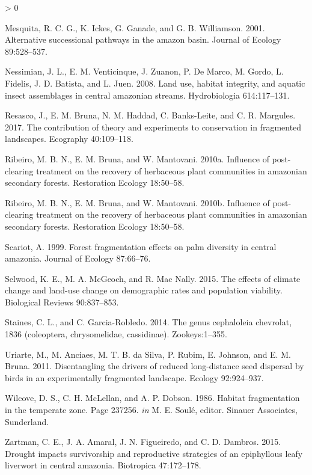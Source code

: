 \documentclass[
  english,
  man]{apa6}
\newlength{\cslhangindent}
\newenvironment{CSLReferences}[2] %
 {%
  \setlength{\parindent}{0pt}
  \ifodd #1 \everypar{\setlength{\hangindent}{\cslhangindent}}\ignorespaces\fi
  \ifnum #2 > 0
  \setlength{\parskip}{#2\baselineskip}
  \fi
 }%
 {}
\begin{document}
\begin{CSLReferences}{1}{0}
\leavevmode\hypertarget{ref-mesquita2001}{}%
Mesquita, R. C. G., K. Ickes, G. Ganade, and G. B. Williamson. 2001. Alternative successional pathways in the amazon basin. Journal of Ecology 89:528--537.

\leavevmode\hypertarget{ref-nessimian2008}{}%
Nessimian, J. L., E. M. Venticinque, J. Zuanon, P. De Marco, M. Gordo, L. Fidelis, J. D. Batista, and L. Juen. 2008. Land use, habitat integrity, and aquatic insect assemblages in central amazonian streams. Hydrobiologia 614:117--131.

\leavevmode\hypertarget{ref-resasco2017}{}%
Resasco, J., E. M. Bruna, N. M. Haddad, C. Banks-Leite, and C. R. Margules. 2017. The contribution of theory and experiments to conservation in fragmented landscapes. Ecography 40:109--118.

\leavevmode\hypertarget{ref-ribeiro2010}{}%
Ribeiro, M. B. N., E. M. Bruna, and W. Mantovani. 2010a. Influence of post-clearing treatment on the recovery of herbaceous plant communities in amazonian secondary forests. Restoration Ecology 18:50--58.

\leavevmode\hypertarget{ref-ribeiro2010a}{}%
Ribeiro, M. B. N., E. M. Bruna, and W. Mantovani. 2010b. Influence of post-clearing treatment on the recovery of herbaceous plant communities in amazonian secondary forests. Restoration Ecology 18:50--58.

\leavevmode\hypertarget{ref-scariot1999}{}%
Scariot, A. 1999. Forest fragmentation effects on palm diversity in central amazonia. Journal of Ecology 87:66--76.

\leavevmode\hypertarget{ref-selwood2015a}{}%
Selwood, K. E., M. A. McGeoch, and R. Mac Nally. 2015. The effects of climate change and land{-}use change on demographic rates and population viability. Biological Reviews 90:837--853.

\leavevmode\hypertarget{ref-staines2014}{}%
Staines, C. L., and C. Garcia-Robledo. 2014. The genus cephaloleia chevrolat, 1836 (coleoptera, chrysomelidae, cassidinae). Zookeys:1--355.

\leavevmode\hypertarget{ref-uriarte2011}{}%
Uriarte, M., M. Anciaes, M. T. B. da Silva, P. Rubim, E. Johnson, and E. M. Bruna. 2011. Disentangling the drivers of reduced long-distance seed dispersal by birds in an experimentally fragmented landscape. Ecology 92:924--937.

\leavevmode\hypertarget{ref-wilcove1986}{}%
Wilcove, D. S., C. H. McLellan, and A. P. Dobson. 1986. Habitat fragmentation in the temperate zone. Page 237256. \emph{in} M. E. Soulé, editor. Sinauer Associates, Sunderland.

\leavevmode\hypertarget{ref-zartman2015}{}%
Zartman, C. E., J. A. Amaral, J. N. Figueiredo, and C. D. Dambros. 2015. Drought impacts survivorship and reproductive strategies of an epiphyllous leafy liverwort in central amazonia. Biotropica 47:172--178.

\end{CSLReferences}
\end{document}
